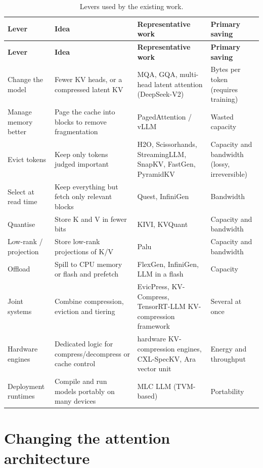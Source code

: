 \documentclass[12pt,a4paper]{report}
\begin{document}
{\fontsize{8}{9.5}\selectfont\setlength{\tabcolsep}{3pt}
\begin{longtable}{>{\raggedright\arraybackslash}p{1.07in}>{\raggedright\arraybackslash}p{1.78in}>{\raggedright\arraybackslash}p{2.05in}>{\raggedright\arraybackslash}p{0.98in}}
\caption{Levers used by the existing work.}\\
\toprule
\textbf{Lever} & \textbf{Idea} & \textbf{Representative work} & \textbf{Primary saving} \\\midrule\endfirsthead
\toprule \textbf{Lever} & \textbf{Idea} & \textbf{Representative work} & \textbf{Primary saving} \\\midrule\endhead
\bottomrule\endfoot
Change the model & Fewer KV heads, or a compressed latent KV & MQA, GQA, multi-head latent attention (DeepSeek-V2) & Bytes per token (requires training) \\
Manage memory better & Page the cache into blocks to remove fragmentation & PagedAttention / vLLM & Wasted capacity \\
Evict tokens & Keep only tokens judged important & H2O, Scissorhands, StreamingLLM, SnapKV, FastGen, PyramidKV & Capacity and bandwidth (lossy, irreversible) \\
Select at read time & Keep everything but fetch only relevant blocks & Quest, InfiniGen & Bandwidth \\
Quantise & Store K and V in fewer bits & KIVI, KVQuant & Capacity and bandwidth \\
Low-rank / projection & Store low-rank projections of K/V & Palu & Capacity and bandwidth \\
Offload & Spill to CPU memory or flash and prefetch & FlexGen, InfiniGen, LLM in a flash & Capacity \\
Joint systems & Combine compression, eviction and tiering & EvicPress, KV-Compress, TensorRT-LLM KV-compression framework & Several at once \\
Hardware engines & Dedicated logic for compress/decompress or cache control & hardware KV-compression engines, CXL-SpecKV, Ara vector unit & Energy and throughput \\
Deployment runtimes & Compile and run models portably on many devices & MLC LLM (TVM-based) & Portability \\
\bottomrule
\end{longtable}}
\section{Changing the attention architecture}\label{sec:2_2}
\end{document}
